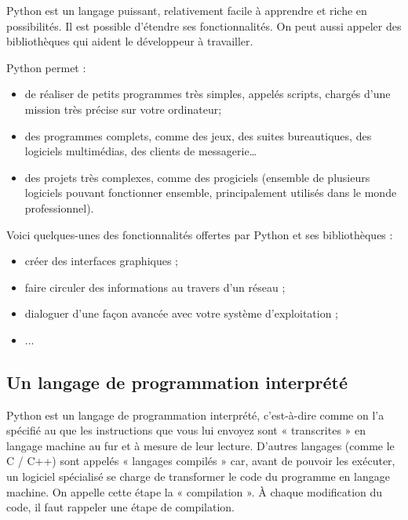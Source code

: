 \documentclass[10pt,fleqn]{article} %
\begin{document}
Python est un langage puissant, relativement facile à apprendre et riche en possibilités. Il est possible d'étendre ses fonctionnalités. On peut aussi appeler des bibliothèques qui aident le développeur à travailler. 


Python permet :
\begin{itemize}
\item de réaliser de petits programmes très simples, appelés scripts, chargés d'une mission très précise sur votre ordinateur;
\item des programmes complets, comme des jeux, des suites bureautiques, des logiciels multimédias, des clients de messagerie…
\item des projets très complexes, comme des progiciels (ensemble de plusieurs logiciels pouvant fonctionner ensemble, principalement utilisés dans le monde professionnel).
\end{itemize}

Voici quelques-unes des fonctionnalités offertes par Python et ses bibliothèques :
\begin{itemize}
\item créer des interfaces graphiques ;
\item faire circuler des informations au travers d'un réseau ;
\item dialoguer d'une façon avancée avec votre système d'exploitation ;
\item ...
\end{itemize}

\subsection{ Un langage de programmation interprété}
Python est un langage de programmation interprété, c'est-à-dire comme on l'a spécifié au que les instructions que vous lui envoyez sont « transcrites » en langage machine au fur et à mesure de leur lecture. D'autres langages (comme le C / C++) sont appelés « langages compilés » car, avant de pouvoir les exécuter, un logiciel spécialisé se charge de transformer le code du programme en langage machine. On appelle cette étape la « compilation ». À chaque modification du code, il faut rappeler une étape de compilation.
\end{document}
